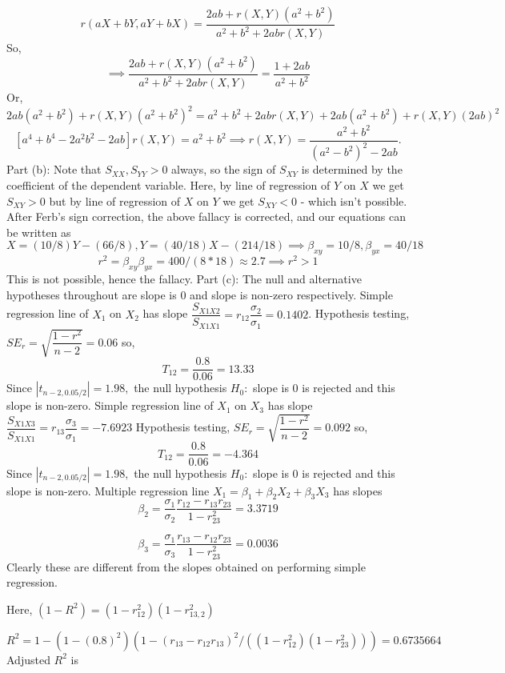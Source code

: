 \documentclass[12pt, oneside]{article}
\begin{document}
\begin{enumerate}
$$r(aX+bY, aY+bX) =\dfrac{2ab + r(X,Y)(a^2+b^2)}{a^2 + b^2 + 2ab r(X,Y)}$$
So, $$\implies \dfrac{2ab + r(X,Y)(a^2+b^2)}{a^2 + b^2 + 2ab r(X,Y)} =  \dfrac{1+2ab}{a^2+b^2}$$
Or,
$$
2ab(a^2+b^2) + r(X,Y)(a^2+b^2)^2 = a^2 + b^2 + 2ab r(X,Y) + 2ab(a^2 + b^2) + r(X,Y) (2ab)^2$$
$$
[a^4+b^4 - 2a^2b^2 -2ab] r(X,Y) = a^2 + b^2 \implies r(X,Y) = \dfrac{a^2+b^2}{(a^2-b^2)^2-2ab}.$$
\newline Part (b): Note that $S_{XX},S_{YY}>0$ always, so the sign of $S_{XY}$ is determined by the coefficient of the dependent variable. Here, by line of regression of $Y$ on $X$ we get $S_{XY}>0$ but by line of regression of $X$ on $Y$ we get $S_{XY}<0$ - which isn't possible. 
\newline After Ferb's sign correction, the above fallacy is corrected, and our equations can be written as 
$$
X = (10/8)Y - (66/8), Y = (40/18)X - (214/18) \implies \beta_{xy} = 10/8, \beta_{yx} = 40/18
$$
$$ r^2 = \beta_{xy} \beta_{yx} = 400/(8*18) \approx 2.7 \implies r^2 > 1
$$
This is not possible, hence the fallacy. 
\newline Part (c): 
The null and alternative hypotheses throughout are slope is 0 and slope is non-zero respectively.
\newline Simple regression line of $X_1$ on $X_2$ has slope $\dfrac{S_{X1X2}}{S_{X1X1}} = r_{12} \dfrac{\sigma_2}{\sigma_1} = 0.1402$.
Hypothesis testing, $SE_r = \sqrt{\dfrac{1-r^2}{n-2}} = 0.06$ so,
$$
T_{12} = \dfrac{0.8}{0.06} = 13.33
$$
Since $|t_{n-2,0.05/2}| = 1.98,$ the null hypothesis $H_0 : $ slope is 0 is rejected and this slope is non-zero.  
\newline Simple regression line of $X_1$ on $X_3$ has slope $\dfrac{S_{X1X3}}{S_{X1X1}} = r_{13} \dfrac{\sigma_3}{\sigma_1} = -7.6923$
Hypothesis testing, $SE_r = \sqrt{\dfrac{1-r^2}{n-2}} = 0.092$ so,
$$
T_{12} = \dfrac{0.8}{0.06} = -4.364
$$
Since $|t_{n-2,0.05/2}| = 1.98,$ the null hypothesis $H_0 : $ slope is 0 is rejected and this slope is non-zero.  
\newline Multiple regression line $X_1 = \beta_1 + \beta_2 X_2 + \beta_3 X_3$ has slopes
$$
\beta_2 = \dfrac{\sigma_1}{\sigma_2} \dfrac{r_{12} - r_{13}r_{23}}{1 - r^2_{23}} = 3.3719$$

$$\beta_3 = \dfrac{\sigma_1}{\sigma_3} \dfrac{r_{13} - r_{12}r_{23}}{1 - r^2_{23}} = 0.0036$$
Clearly these are different from the slopes obtained on performing simple regression. 

Here, $(1-R^2) = (1-r_{12}^2)(1-r_{13,2}^2)$

$$R^2 = 1 - (1-(0.8)^2)(1-(r_{13}-r_{12}r_{13})^2/((1-r_{12}^2)(1-r_{23}^2))) = 0.6735664$$
Adjusted $R^2$ is


\end{enumerate}
\end{document}
